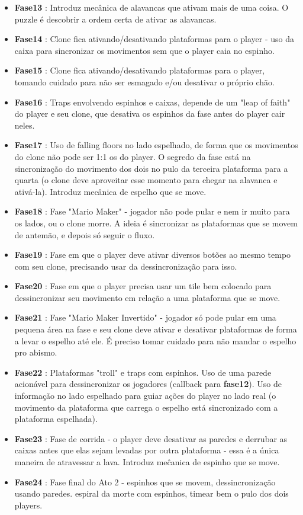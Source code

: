 \documentclass[a4paper, 11pt]{article}
\begin{document}
	\begin{itemize} 
		\item \textbf{Fase13} : Introduz mecânica de alavancas que ativam mais de uma coisa. O puzzle é descobrir a ordem certa de ativar as alavancas.
		\item \textbf{Fase14} : Clone fica ativando/desativando plataformas para o player - uso da caixa para sincronizar os movimentos sem que o player caia no espinho.
		\item \textbf{Fase15} : Clone fica ativando/desativando plataformas para o player, tomando cuidado para não ser esmagado e/ou desativar o próprio chão.
		\item \textbf{Fase16} : Traps envolvendo espinhos e caixas, depende de um "leap of faith" do player e seu clone, que desativa os espinhos da fase antes do player cair neles.
		\item \textbf{Fase17} : Uso de falling floors no lado espelhado, de forma que os movimentos do clone não pode ser 1:1 os do player. O segredo da fase está na sincronização do movimento dos dois no pulo da terceira plataforma para a quarta (o clone deve aproveitar esse momento para chegar na alavanca e ativá-la). Introduz mecânica de espelho que se move.
		\item \textbf{Fase18} : Fase "Mario Maker" - jogador não pode pular e nem ir muito para os lados, ou o clone morre. A ideia é sincronizar as plataformas que se movem de antemão, e depois só seguir o fluxo.
		\item \textbf{Fase19} : Fase em que o player deve ativar diversos botões ao mesmo tempo com seu clone, precisando usar da dessincronização para isso.
		\item \textbf{Fase20} : Fase em que o player precisa usar um tile bem colocado para dessincronizar seu movimento em relação a uma plataforma que se move.
		\item \textbf{Fase21} : Fase "Mario Maker Invertido" - jogador só pode pular em uma pequena área na fase e seu clone deve ativar e desativar plataformas de forma a levar o espelho até ele. É preciso tomar cuidado para não mandar o espelho pro abismo.
		\item \textbf{Fase22} : Plataformas "troll" e traps com espinhos. Uso de uma parede acionável para dessincronizar os jogadores (callback para \textbf{fase12}). Uso de informação no lado espelhado para guiar ações do player no lado real (o movimento da plataforma que carrega o espelho está sincronizado com a plataforma espelhada).
		\item \textbf{Fase23} : Fase de corrida - o player deve desativar as paredes e derrubar as caixas antes que elas sejam levadas por outra plataforma - essa é a única maneira de atravessar a lava. Introduz meĉanica de espinho que se move.
		\item \textbf{Fase24} : Fase final do Ato 2 - espinhos que se movem, dessincronização usando paredes. espiral da morte com espinhos, timear bem o pulo dos dois players.
	\end{itemize} 
 
\end{document}
